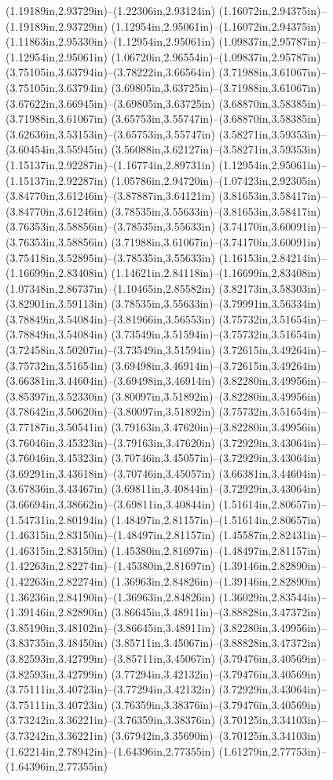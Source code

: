 (1.19189in,2.93729in)--(1.22306in,2.93124in) (1.16072in,2.94375in)--(1.19189in,2.93729in) (1.12954in,2.95061in)--(1.16072in,2.94375in) (1.11863in,2.95330in)--(1.12954in,2.95061in) (1.09837in,2.95787in)--(1.12954in,2.95061in) (1.06720in,2.96554in)--(1.09837in,2.95787in) (3.75105in,3.63794in)--(3.78222in,3.66564in) (3.71988in,3.61067in)--(3.75105in,3.63794in) (3.69805in,3.63725in)--(3.71988in,3.61067in) (3.67622in,3.66945in)--(3.69805in,3.63725in) (3.68870in,3.58385in)--(3.71988in,3.61067in) (3.65753in,3.55747in)--(3.68870in,3.58385in) (3.62636in,3.53153in)--(3.65753in,3.55747in) (3.58271in,3.59353in)--(3.60454in,3.55945in) (3.56088in,3.62127in)--(3.58271in,3.59353in) (1.15137in,2.92287in)--(1.16774in,2.89731in) (1.12954in,2.95061in)--(1.15137in,2.92287in) (1.05786in,2.94720in)--(1.07423in,2.92305in) (3.84770in,3.61246in)--(3.87887in,3.64121in) (3.81653in,3.58417in)--(3.84770in,3.61246in) (3.78535in,3.55633in)--(3.81653in,3.58417in) (3.76353in,3.58856in)--(3.78535in,3.55633in) (3.74170in,3.60091in)--(3.76353in,3.58856in) (3.71988in,3.61067in)--(3.74170in,3.60091in) (3.75418in,3.52895in)--(3.78535in,3.55633in) (1.16153in,2.84214in)--(1.16699in,2.83408in) (1.14621in,2.84118in)--(1.16699in,2.83408in) (1.07348in,2.86737in)--(1.10465in,2.85582in) (3.82173in,3.58303in)--(3.82901in,3.59113in) (3.78535in,3.55633in)--(3.79991in,3.56334in) (3.78849in,3.54084in)--(3.81966in,3.56553in) (3.75732in,3.51654in)--(3.78849in,3.54084in) (3.73549in,3.51594in)--(3.75732in,3.51654in) (3.72458in,3.50207in)--(3.73549in,3.51594in) (3.72615in,3.49264in)--(3.75732in,3.51654in) (3.69498in,3.46914in)--(3.72615in,3.49264in) (3.66381in,3.44604in)--(3.69498in,3.46914in) (3.82280in,3.49956in)--(3.85397in,3.52330in) (3.80097in,3.51892in)--(3.82280in,3.49956in) (3.78642in,3.50620in)--(3.80097in,3.51892in) (3.75732in,3.51654in)--(3.77187in,3.50541in) (3.79163in,3.47620in)--(3.82280in,3.49956in) (3.76046in,3.45323in)--(3.79163in,3.47620in) (3.72929in,3.43064in)--(3.76046in,3.45323in) (3.70746in,3.45057in)--(3.72929in,3.43064in) (3.69291in,3.43618in)--(3.70746in,3.45057in) (3.66381in,3.44604in)--(3.67836in,3.43467in) (3.69811in,3.40844in)--(3.72929in,3.43064in) (3.66694in,3.38662in)--(3.69811in,3.40844in) (1.51614in,2.80657in)--(1.54731in,2.80194in) (1.48497in,2.81157in)--(1.51614in,2.80657in) (1.46315in,2.83150in)--(1.48497in,2.81157in) (1.45587in,2.82431in)--(1.46315in,2.83150in) (1.45380in,2.81697in)--(1.48497in,2.81157in) (1.42263in,2.82274in)--(1.45380in,2.81697in) (1.39146in,2.82890in)--(1.42263in,2.82274in) (1.36963in,2.84826in)--(1.39146in,2.82890in) (1.36236in,2.84190in)--(1.36963in,2.84826in) (1.36029in,2.83544in)--(1.39146in,2.82890in) (3.86645in,3.48911in)--(3.88828in,3.47372in) (3.85190in,3.48102in)--(3.86645in,3.48911in) (3.82280in,3.49956in)--(3.83735in,3.48450in) (3.85711in,3.45067in)--(3.88828in,3.47372in) (3.82593in,3.42799in)--(3.85711in,3.45067in) (3.79476in,3.40569in)--(3.82593in,3.42799in) (3.77294in,3.42132in)--(3.79476in,3.40569in) (3.75111in,3.40723in)--(3.77294in,3.42132in) (3.72929in,3.43064in)--(3.75111in,3.40723in) (3.76359in,3.38376in)--(3.79476in,3.40569in) (3.73242in,3.36221in)--(3.76359in,3.38376in) (3.70125in,3.34103in)--(3.73242in,3.36221in) (3.67942in,3.35690in)--(3.70125in,3.34103in) (1.62214in,2.78942in)--(1.64396in,2.77355in) (1.61279in,2.77753in)--(1.64396in,2.77355in) 